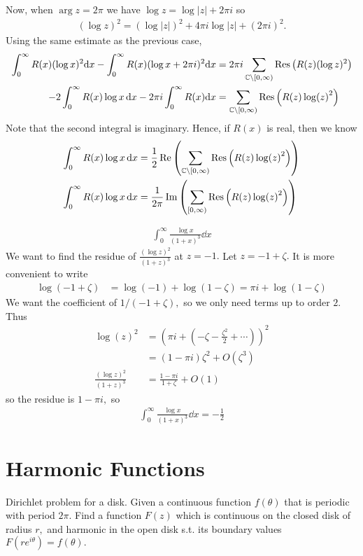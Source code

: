 \documentclass[a4paper,12pt]{article}
\begin{document}
Now, when $\arg z=2\pi$ we have $\log z=\log |z|+2\pi i$ so \begin{align}
    (\log z)^2=(\log |z|)^2+4\pi i\log |z|+(2\pi i)^2.
\end{align} 
Using the same estimate as the previous case, \begin{align}
    \int_0^\infty R(x)(\log x)^2\dd x-\int_0^\infty R(x)(\log x+2\pi i)^2\dd x&=2\pi i\sum_{\mathbb{C}\setminus[0,\infty)}\mathrm{Res}\left(R(z)(\log z)^2\right)\\
    -2\int_{0}^\infty R(x)\log x\,\dd x-2\pi i\int_0^\infty R(x)\dd x&=\sum_{\mathbb{C}\setminus[0,\infty)}\mathrm{Res}\left(R(z)\log(z)^2\right)
\end{align}
Note that the second integral is imaginary. Hence, if $R(x)$ is real, then we know \begin{align}
    \int_0^\infty R(x)\log x\,\dd x&=\frac{1}{2}\Re\left(\sum_{\mathbb{C}\setminus[0,\infty)}\mathrm{Res}\left(R(z)\log(z)^2\right)\right)\\
    \int_0^\infty R(x)\log x\,\dd x&=\frac{1}{2\pi}\Im\left(\sum_{[0,\infty)}\mathrm{Res}\left(R(z)\log(z)^2\right)\right)
\end{align}
\begin{example}
    \begin{align}
        \int_0^\infty\frac{\log x}{(1+x)^3}\dd x
    \end{align}
    We want to find the residue of $\frac{(\log z)^2}{(1+z)^3}$ at $z=-1.$ Let $z=-1+\zeta.$ It is more convenient to write \begin{align}
        \log(-1+\zeta)&=\log(-1)+\log(1-\zeta)=\pi i+\log(1-\zeta)
    \end{align}
    We want the coefficient of $1/(-1+\zeta),$ so we only need terms up to order $2.$ Thus \begin{align}
        \log(z)^2&=\left(\pi i+\left(-\zeta-\frac{\zeta^2}{2}+\cdots\right)\right)^2\\
        &=(1-\pi i)\zeta^2+O(\zeta^3)\\
        \frac{(\log z)^2}{(1+z)^3}&=\frac{1-\pi i}{1+\zeta}+O(1)
    \end{align}
    so the residue is $1-\pi i,$ so \begin{align}
        \int_0^\infty\frac{\log x}{(1+x)^3}\dd x=-\frac{1}{2}
    \end{align}
\end{example}
\section{Harmonic Functions}
Dirichlet problem for a disk. Given a continuous function $f(\theta)$ that is periodic with period $2\pi.$ Find a function $F(z)$ which is continuous on the closed disk of radius $r,$ and harmonic in the open disk s.t. its boundary values $F(re^{i\theta})=f(\theta).$
\end{document}

